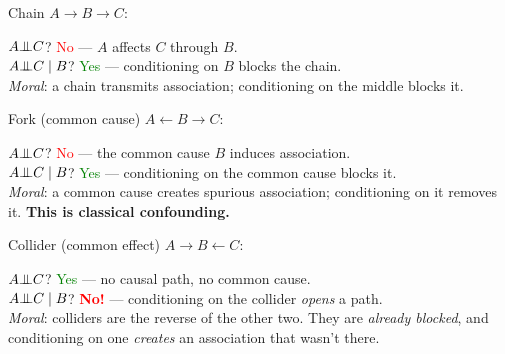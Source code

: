 \documentclass[xcolor=dvipsnames]{beamer}
\newcommand{\la}{\leftarrow}
\newcommand{\indep}{{\bot\negthickspace\negthickspace\bot}}
\begin{document}
\begin{frame}{Chain}
\small
$A \to B \to C$:
\begin{center}
\end{center}

\medskip
{} $A \indep C$?  \textcolor{Red}{No} --- $A$ affects $C$ through $B$.\\
\medskip
{} $A \indep C \mid B$?  \textcolor{Green}{Yes} --- conditioning on $B$ blocks the chain.\\
\medskip
{} \textit{Moral}: a chain transmits association; conditioning on the middle blocks it.
\end{frame}


\begin{frame}{Fork (common cause)}
\small
$A \la B \to C$:
\begin{center}
\end{center}

\medskip
{} $A \indep C$?  \textcolor{Red}{No} --- the common cause $B$ induces association.\\
\medskip
{} $A \indep C \mid B$?  \textcolor{Green}{Yes} --- conditioning on the common cause blocks it.\\
\medskip
{} \textit{Moral}: a common cause creates spurious association; conditioning on it removes it.  \textbf{This is classical confounding.}
\end{frame}


\begin{frame}{Collider (common effect)}
\small
$A \to B \la C$:
\begin{center}
\end{center}

\medskip
{} $A \indep C$?  \textcolor{Green}{Yes} --- no causal path, no common cause.\\
\medskip
{} $A \indep C \mid B$?  \textcolor{Red}{\textbf{No!}} --- conditioning on the collider \textit{opens} a path.\\

\bigskip
{} \textit{Moral}: colliders are the reverse of the other two.  They are \textit{already blocked}, and conditioning on one \textit{creates} an association that wasn't there.
\end{frame}
\end{document}
